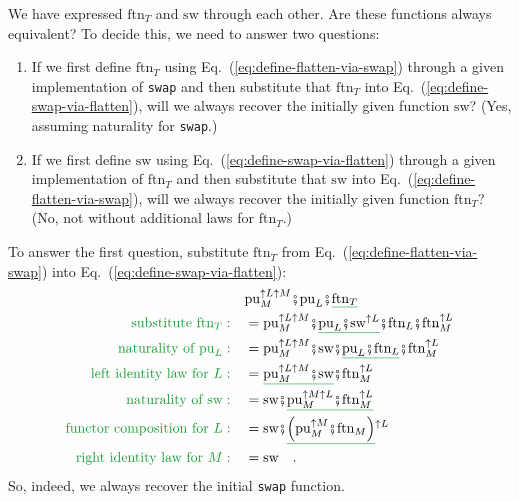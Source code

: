 We have expressed $\text{ftn}_{T}$ and $\text{sw}$ through each
other. Are these functions always equivalent? To decide this, we need
to answer two questions:
\begin{enumerate}
\item If we first define $\text{ftn}_{T}$ using Eq.~(\ref{eq:define-flatten-via-swap})
through a given implementation of \lstinline!swap!
and then substitute that $\text{ftn}_{T}$ into Eq.~(\ref{eq:define-swap-via-flatten}),
will we always recover the initially given function $\text{sw}$?
(Yes, assuming naturality for \lstinline!swap!.)
\item If we first define $\text{sw}$ using Eq.~(\ref{eq:define-swap-via-flatten})
through a given implementation of $\text{ftn}_{T}$ and then substitute
that $\text{sw}$ into Eq.~(\ref{eq:define-flatten-via-swap}), will
we always recover the initially given function $\text{ftn}_{T}$?
(No, not without additional laws for $\text{ftn}_{T}$.)
\end{enumerate}
To answer the first question, substitute $\text{ftn}_{T}$ from Eq.~(\ref{eq:define-flatten-via-swap})
into Eq.~(\ref{eq:define-swap-via-flatten}):
\begin{align*}
 & \text{pu}_{M}^{\uparrow L\uparrow M}\bef\text{pu}_{L}\bef\gunderline{\text{ftn}_{T}}\\
{\color{greenunder}\text{substitute }\text{ftn}_{T}:}\quad & =\text{pu}_{M}^{\uparrow L\uparrow M}\bef\gunderline{\text{pu}_{L}\bef\text{sw}^{\uparrow L}}\bef\text{ftn}_{L}\bef\text{ftn}_{M}^{\uparrow L}\\
{\color{greenunder}\text{naturality of }\text{pu}_{L}:}\quad & =\text{pu}_{M}^{\uparrow L\uparrow M}\bef\text{sw}\bef\gunderline{\text{pu}_{L}\bef\text{ftn}_{L}}\bef\text{ftn}_{M}^{\uparrow L}\\
{\color{greenunder}\text{left identity law for }L:}\quad & =\gunderline{\text{pu}_{M}^{\uparrow L\uparrow M}\bef\text{sw}}\bef\text{ftn}_{M}^{\uparrow L}\\
{\color{greenunder}\text{naturality of }\text{sw}:}\quad & =\text{sw}\bef\gunderline{\text{pu}_{M}^{\uparrow M\uparrow L}\bef\text{ftn}_{M}^{\uparrow L}}\\
{\color{greenunder}\text{functor composition for }L:}\quad & =\text{sw}\bef\gunderline{\left(\text{pu}_{M}^{\uparrow M}\bef\text{ftn}_{M}\right)}^{\uparrow L}\\
{\color{greenunder}\text{right identity law for }M:}\quad & =\text{sw}\quad.
\end{align*}
So, indeed, we always recover the initial \lstinline!swap!
function.

